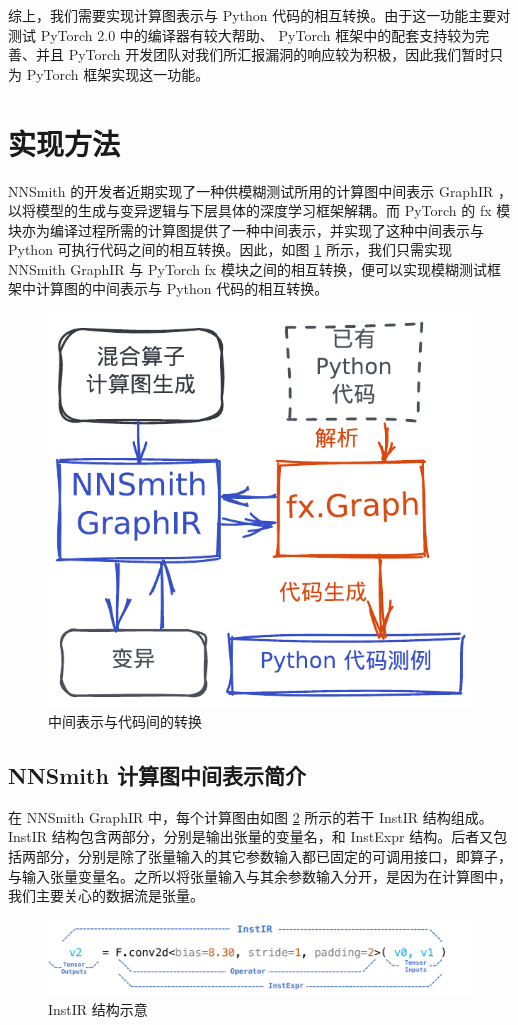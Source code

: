 综上，我们需要实现计算图表示与 Python 代码的相互转换。由于这一功能主要对测试 PyTorch 2.0 中的编译器有较大帮助、 PyTorch 框架中的配套支持较为完善、并且 PyTorch 开发团队对我们所汇报漏洞的响应较为积极，因此我们暂时只为 PyTorch 框架实现这一功能。

\section{实现方法}

NNSmith 的开发者近期实现了一种供模糊测试所用的计算图中间表示 GraphIR ，以将模型的生成与变异逻辑与下层具体的深度学习框架解耦。而 PyTorch 的 fx 模块\cite{torch_fx}亦为编译过程所需的计算图提供了一种中间表示，并实现了这种中间表示与 Python 可执行代码之间的相互转换。因此，如图 \ref{fig:convert} 所示，我们只需实现 NNSmith GraphIR 与 PyTorch fx 模块之间的相互转换，便可以实现模糊测试框架中计算图的中间表示与 Python 代码的相互转换。

\begin{figure}
    \centering
    \includegraphics[width=.5\linewidth]{figures/convert.pdf}
    \caption{中间表示与代码间的转换}
    \label{fig:convert}
\end{figure}

\subsection{NNSmith 计算图中间表示简介}

在 NNSmith GraphIR 中，每个计算图由如图 \ref{fig:instir} 所示的若干 InstIR 结构组成。 InstIR 结构包含两部分，分别是输出张量的变量名，和 InstExpr 结构。后者又包括两部分，分别是除了张量输入的其它参数输入都已固定的可调用接口，即算子，与输入张量变量名。之所以将张量输入与其余参数输入分开，是因为在计算图中，我们主要关心的数据流是张量。

\begin{figure}
    \centering
    \includegraphics[width=1.\linewidth]{figures/instir.pdf}
    \caption{InstIR 结构示意}
    \label{fig:instir}
\end{figure}

